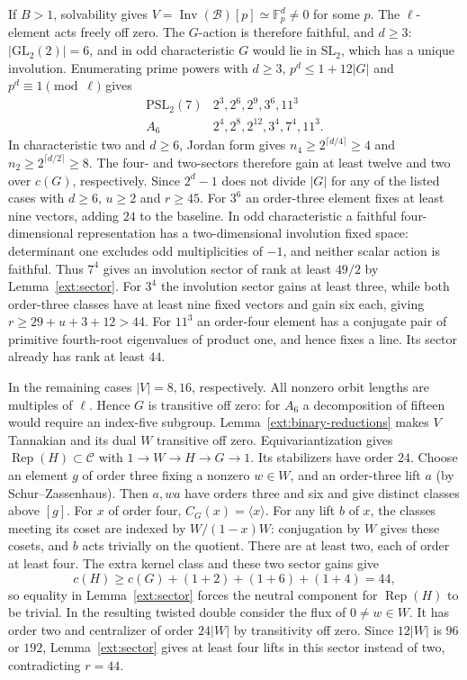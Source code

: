 \documentclass[11pt]{amsart}
\numberwithin{equation}{section}
\theoremstyle{definition}
\theoremstyle{plain}
\newcommand{\C}{\mathcal C}
\begin{document}
If $B>1$, solvability gives $V=\operatorname{Inv}(\mathcal B)[p]
\simeq\mathbb F_p^d\ne0$ for some $p$. The $\ell$-element acts freely
off zero. The $G$-action is therefore faithful, and $d\ge3$:
$|\mathrm{GL}_2(2)|=6$, and in odd characteristic $G$ would lie
in $\mathrm{SL}_2$, which has a unique involution. Enumerating prime
powers with $d\ge3$, $p^d\le1+12|G|$ and $p^d\equiv1\pmod\ell$ gives
\[
\begin{array}{c|l}
\mathrm{PSL}_2(7)&2^3,2^6,2^9,3^6,11^3\\
A_6&2^4,2^8,2^{12},3^4,7^4,11^3 .
\end{array}
\]
In characteristic two and $d\ge6$, Jordan form gives
$n_4\ge 2^{\lceil d/4\rceil}\ge4$ and
$n_2\ge 2^{\lceil d/2\rceil}\ge8$.
The four- and two-sectors therefore gain at least twelve and two
over $c(G)$, respectively. Since $2^d-1$ does not divide $|G|$
for any of the listed cases with $d\ge6$, $u\ge2$ and $r\ge45$.
For $3^6$ an order-three element fixes at least nine vectors, adding
$24$ to the baseline. In odd characteristic a faithful
four-dimensional representation has a two-dimensional involution
fixed space: determinant one excludes odd multiplicities of $-1$,
and neither scalar action is faithful. Thus $7^4$ gives an
involution sector of rank at least $49/2$ by Lemma~\ref{ext:sector}.
For $3^4$ the involution sector gains at least three, while both
order-three classes have at least nine fixed vectors and gain six
each, giving $r\ge29+u+3+12>44$.
For $11^3$ an order-four element has a conjugate pair of primitive
fourth-root eigenvalues of product one, and hence fixes a line.
Its sector already has rank at least $44$.

In the remaining cases $|V|=8,16$, respectively. All nonzero orbit
lengths are multiples of $\ell$. Hence $G$ is transitive off zero:
for $A_6$ a decomposition of fifteen would require an index-five
subgroup. Lemma~\ref{ext:binary-reductions} makes $V$ Tannakian and its dual
$W$ transitive off zero. Equivariantization gives
$\operatorname{Rep}(H)\subset\C$ with $1\to W\to H\to G\to1$.
Its stabilizers have order $24$. Choose an element $g$ of order three
fixing a nonzero $w\in W$, and an order-three lift $a$ (by
Schur--Zassenhaus). Then $a,wa$ have orders three and six and give
distinct classes above $[g]$. For $x$ of order four, $C_G(x)=\langle
x\rangle$. For any lift $b$ of $x$, the classes meeting its coset are
indexed by $W/(1-x)W$: conjugation by $W$ gives these cosets, and
$b$ acts trivially on the quotient. There are at least two, each
of order at least four. The extra kernel class and these two sector
gains give
\[
c(H)\ge c(G)+(1+2)+(1+6)+(1+4)=44,
\]
so equality in Lemma~\ref{ext:sector} forces the neutral component
for $\operatorname{Rep}(H)$ to be trivial. In the resulting twisted
double consider the flux of $0\ne w\in W$. It has order two
and centralizer of order $24|W|$ by transitivity off zero.
Since $12|W|$ is $96$ or $192$, Lemma~\ref{ext:sector} gives at least
four lifts in this sector instead of two, contradicting $r=44$.
\end{document}
